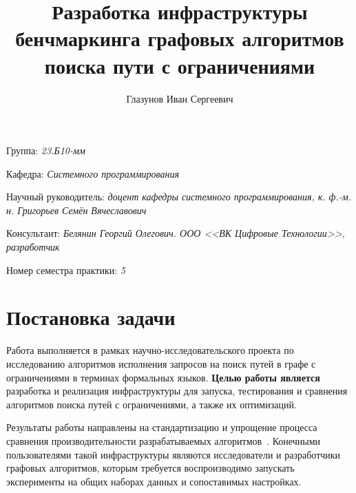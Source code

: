 \documentclass[a4paper]{article}
\title{Разработка инфраструктуры бенчмаркинга графовых алгоритмов поиска пути с ограничениями}
\author{Глазунов Иван Сергеевич}
\date{}
\begin{document}
\maketitle

\begin{flushright}
    Группа: \emph{23.Б10-мм}

    Кафедра: \emph{Системного программирования}

    Научный руководитель: \emph{доцент кафедры системного программирования, к. ф.-м. н. Григорьев Семён Вячеславович}

    Консультант: \emph{Белянин Георгий Олегович. ООО <<ВК Цифровые Технологии>>, разработчик}

    Номер семестра практики: \emph{5}
\end{flushright}


\section{Постановка задачи}

Работа выполняется в рамках научно-исследовательского проекта по исследованию алгоритмов исполнения запросов на поиск путей в графе
с ограничениями в терминах формальных языков.
\textbf{Целью работы является} разработка и реализация инфраструктуры для запуска, тестирования и сравнения алгоритмов поиска путей с ограничениями, а также их оптимизаций.

Результаты работы направлены на стандартизацию и упрощение процесса сравнения производительности разрабатываемых
алгоритмов~\cite{single-source-rpq, lanegg}.
Конечными пользователями такой инфраструктуры являются исследователи и разработчики графовых алгоритмов, которым требуется воспроизводимо запускать эксперименты на общих наборах данных и сопоставимых настройках.
\end{document}
